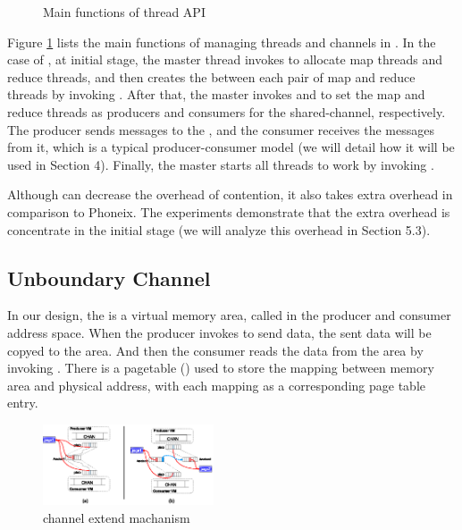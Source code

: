 \label{sec:pm:thread}
\begin{figure}[htpb]

\caption{Main functions of \myth thread API}
\label{fig:api:thread}
\end{figure}

Figure \ref{fig:api:thread} lists the main functions of managing threads and channels in \myth.
In the case of \myds, at initial stage, the master thread invokes  to allocate map threads and reduce threads, and then creates the \chan  between each pair of map and reduce threads by invoking .
After that, the master invokes  and  to set the map and reduce threads as producers and consumers for the shared-channel, respectively.
The producer sends messages to the \chan, and the consumer receives the messages from it,
which is a typical producer-consumer model (we will detail how it will be used in Section 4). 
Finally, the master starts all threads to work by invoking .

Although \myth can decrease the overhead of contention,
it also takes extra overhead in comparison to Phoneix. The experiments demonstrate that the extra overhead 
is concentrate in the initial stage (we will analyze this overhead in Section 5.3). 


\subsection{Unboundary Channel}
In our design, the \chan is a virtual memory area, called  in the producer and consumer address space.
When the producer invokes  to send data, the sent data will be copyed to the  area.
And then the consumer reads the data from the  area  by invoking .
There is a pagetable () used to store the mapping between  memory area and physical address, with each mapping as a corresponding page table entry.

\begin{figure}[!h!t]  
	\centering
	\includegraphics[width=0.45\textwidth]{eps/chan_extend.eps}
	\caption{channel extend machanism}
	\label{fig:spmckern:extend}
\end{figure}


